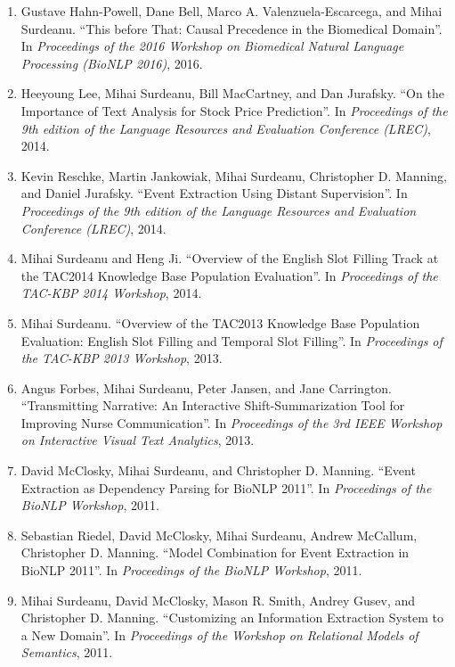 \documentclass[10pt]{article}
\newcommand{\ve}[1]{{\em #1}} %
\newcommand{\ti}[1]{``#1''} %
\begin{document}
\begin{description}
\begin{enumerate}
\item
Gustave Hahn-Powell, Dane Bell, Marco A. Valenzuela-Escarcega, and Mihai Surdeanu.  \ti{This before That: Causal Precedence in the Biomedical Domain}.  In \ve{Proceedings of the 2016 Workshop on Biomedical Natural Language Processing (BioNLP 2016)}, 2016.

\item
Heeyoung Lee, Mihai Surdeanu, Bill MacCartney, and Dan Jurafsky.  \ti{On the Importance of Text Analysis for Stock Price Prediction}.  In \ve{Proceedings of the 9th edition of the Language Resources and Evaluation Conference (LREC)}, 2014.

\item
Kevin Reschke, Martin Jankowiak, Mihai Surdeanu, Christopher D. Manning, and Daniel Jurafsky.  \ti{Event Extraction Using Distant Supervision}.  In \ve{Proceedings of the 9th edition of the Language Resources and Evaluation Conference (LREC)}, 2014.

\item
Mihai Surdeanu and Heng Ji.  \ti{Overview of the English Slot Filling Track at the TAC2014 Knowledge Base Population Evaluation}.  In \ve{Proceedings of the TAC-KBP 2014 Workshop}, 2014.

\item
Mihai Surdeanu.  \ti{Overview of the TAC2013 Knowledge Base Population Evaluation: English Slot Filling and Temporal Slot Filling}.  In \ve{Proceedings of the TAC-KBP 2013 Workshop}, 2013.

\item
Angus Forbes, Mihai Surdeanu, Peter Jansen, and Jane Carrington.  \ti{Transmitting Narrative: An Interactive Shift-Summarization Tool for Improving Nurse Communication}.  In \ve{Proceedings of the 3rd IEEE Workshop on Interactive Visual Text Analytics}, 2013.

\item
David McClosky, Mihai Surdeanu, and Christopher D. Manning.  \ti{Event Extraction as Dependency Parsing for BioNLP 2011}.  In \ve{Proceedings of the BioNLP Workshop}, 2011.

\item
Sebastian Riedel, David McClosky, Mihai Surdeanu, Andrew McCallum, Christopher D. Manning.  \ti{Model Combination for Event Extraction in BioNLP 2011}.  In \ve{Proceedings of the BioNLP Workshop}, 2011.

\item
Mihai Surdeanu, David McClosky, Mason R. Smith, Andrey Gusev, and Christopher D. Manning.  \ti{Customizing an Information Extraction System to a New Domain}.  In \ve{Proceedings of the Workshop on Relational Models of Semantics}, 2011.


\end{enumerate}
\end{description}
\end{document}
